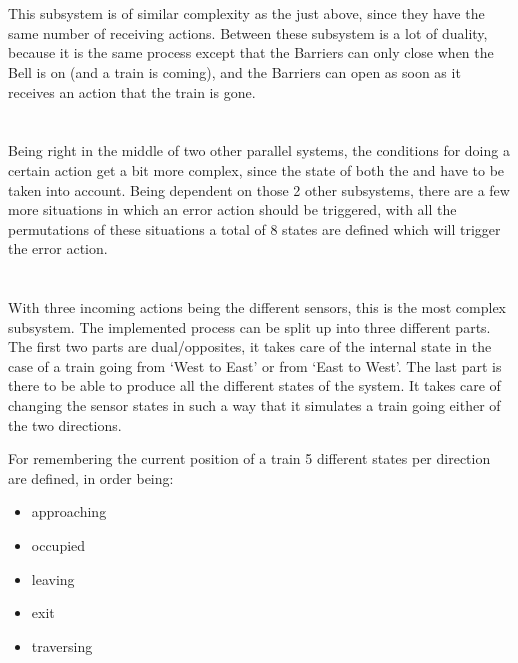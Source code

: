\documentclass[final]{report}
\begin{document}
\section{}
This subsystem is of similar complexity as the  just above, since they have the same number of receiving actions.
Between these subsystem is a lot of duality, because it is the same process except that the Barriers can only close when the Bell is on (and a train is coming), and the Barriers can open as soon as it receives an action that the train is gone.

\section{}
Being right in the middle of two other parallel systems, the conditions for doing a certain action get a bit more complex, since the state of both the  and   have to be taken into account.
Being dependent on those 2 other subsystems, there are a few more situations in which an error action should be triggered, with all the permutations of these situations a total of 8 states are defined which will trigger the error action.

\section{}
With three incoming actions being the different sensors, this is the most complex subsystem.
The implemented process can be split up into three different parts.
The first two parts are dual/opposites, it takes care of the internal state in the case of a train going from `West to East' or from `East to West'.
The last part is there to be able to produce all the different states of the system.
It takes care of changing the sensor states in such a way that it simulates a train going either of the two directions.

For remembering the current position of a train 5 different states per direction are defined, in order being:
\begin{itemize}
    \item approaching
    \item occupied
    \item leaving
    \item exit
    \item traversing
\end{itemize}
\end{document}
